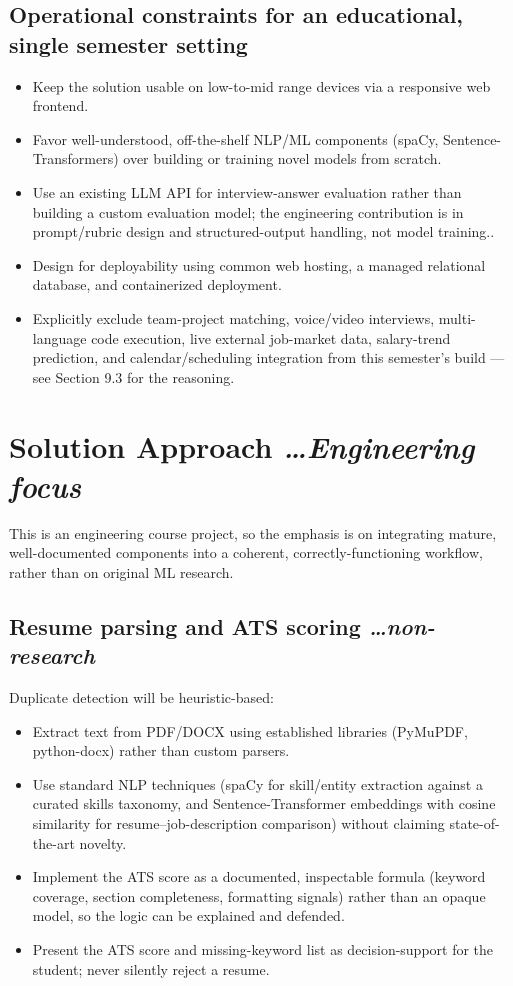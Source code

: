 \documentclass[11pt,a4paper]{article}
\newcommand{\BvrHint}[1]{%
  {\normalfont\normalsize\itshape\hfill #1}}
\begin{document}
\subsection{Operational constraints for an educational, single semester setting}
\begin{itemize}[leftmargin=0.7cm]
    \item Keep the solution usable on low-to-mid range devices via a responsive web frontend.
    \item Favor well-understood, off-the-shelf NLP/ML components (spaCy, Sentence-Transformers) over building or training novel models from scratch.
    \item Use an existing LLM API for interview-answer evaluation rather than building a custom evaluation model; the engineering contribution is in prompt/rubric design and structured-output handling, not model training..
    \item Design for deployability using common web hosting, a managed relational database, and containerized deployment.
    \item Explicitly exclude team-project matching, voice/video interviews, multi-language code execution, live external job-market data, salary-trend prediction, and calendar/scheduling integration from this semester's build — see Section 9.3 for the reasoning.
\end{itemize}

\section{Solution Approach %
\BvrHint{\ldots Engineering focus}}
This is an engineering course project, so the emphasis is on integrating mature, well-documented components into a coherent, correctly-functioning workflow, rather than on original ML research.

\subsection{Resume parsing and ATS scoring %
\BvrHint{\ldots non-research}}
Duplicate detection will be heuristic-based:
\begin{itemize}[leftmargin=0.7cm]
    \item Extract text from PDF/DOCX using established libraries (PyMuPDF, python-docx) rather than custom parsers. 
    \item Use standard NLP techniques (spaCy for skill/entity extraction against a curated skills taxonomy, and Sentence-Transformer embeddings with cosine similarity for resume–job-description comparison) without claiming state-of-the-art novelty. 
    \item Implement the ATS score as a documented, inspectable formula (keyword coverage, section completeness, formatting signals) rather than an opaque model, so the logic can be explained and defended. 
    \item Present the ATS score and missing-keyword list as decision-support for the student; never silently reject a resume.
\end{itemize}
\end{document}
